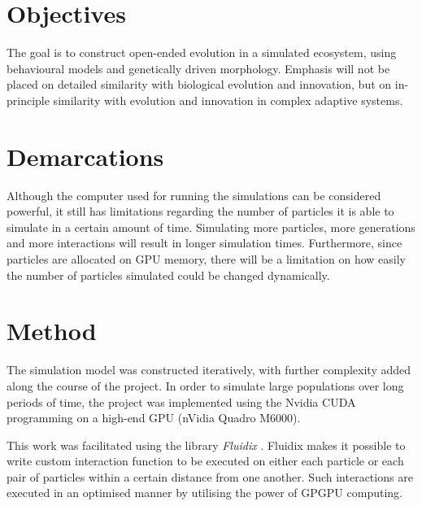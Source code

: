 \section{Objectives}
The goal is to construct open-ended evolution in a simulated ecosystem, using behavioural models and genetically driven morphology. Emphasis will not be placed on detailed similarity with biological evolution and innovation, but on in-principle similarity with evolution and innovation in complex adaptive systems.

\section{Demarcations}
Although the computer used for running the simulations can be considered powerful, it still has limitations regarding the number of particles it is able to simulate in a certain amount of time. Simulating more particles, more generations and more interactions will result in longer simulation times.  Furthermore, since particles are allocated on GPU memory, there will be a limitation on how easily the number of particles simulated could be changed dynamically.

\section{Method} %
The simulation model was constructed iteratively, with further complexity added along the course of the project. In order to simulate large populations over long periods of time, the project was implemented using the Nvidia CUDA programming on a high-end GPU (nVidia Quadro M6000).

This work was facilitated using the library \emph{Fluidix} \citep{fluidix}. Fluidix makes it possible to write custom interaction function to be executed on either each particle or each pair of particles within a certain distance from one another. Such interactions are executed in an optimised manner by utilising the power of GPGPU computing.